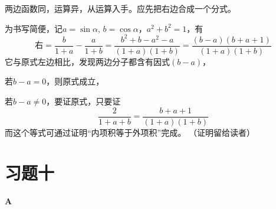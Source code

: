 \begin{analyze}
 两边函数同，运算异，从运算入手。应先把右边合成一个分式。

为书写简便，记$a=\sin\alpha$, $b=\cos\alpha$，$a^2+b^2=1$，有
\[\text{右}=\frac{b}{1+a}-\frac{a}{1+b}=\frac{b^2+b-a^2-a}{(1+a)(1+b)}=\frac{(b-a)(b+a+1)}{(1+a)(1+b)}\]
它与原式左边相比，发现两边分子都含有因式$(b-a)$，

若$b-a=0$，则原式成立，

若$b-a\ne 0$，要证原式，只要证
\[\frac{2}{1+a+b}=\frac{b+a+1}{(1+a)(1+b)}\]
而这个等式可通过证明“内项积等于外项积”完成。
（证明留给读者）
\end{analyze}

\section*{习题十}
\begin{center}
    \bfseries A
\end{center}

